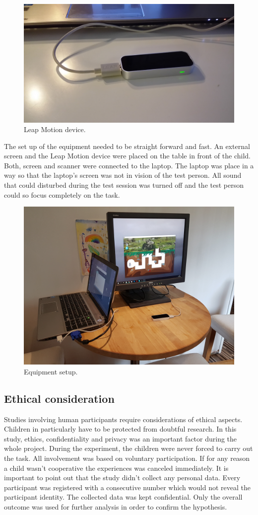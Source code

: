\begin{figure}[h]  %
  \centering
  \includegraphics[width=.5\textwidth]{figures/LMdevice.jpg}
  \caption[Leap Motion device.]{Leap Motion device.}
  \label{fig:setup}
\end{figure}

The set up of the equipment needed to be straight forward and fast. An external screen and the Leap Motion device were placed on the table in front of the child. Both, screen and scanner were connected to the laptop. The laptop was place in a way so that the laptop’s screen was not in vision of the test person. All sound that could disturbed during the test session was turned off and the test person could so focus completely on the task.

\begin{figure}[h]  %
  \centering
  \includegraphics[width=.5\textwidth]{figures/setup.jpg}
  \caption[Equipment setup.]{Equipment setup.}
  \label{fig:setup}
\end{figure}


\subsection{Ethical consideration}
\label{sec:ethical}

Studies involving human participants require considerations of ethical aspects. Children in particularly have to be protected from doubtful research. In this study, ethics, confidentiality and privacy was an important factor during the whole project.
During the experiment, the children were never forced to carry out the task. All involvement was based on voluntary participation. If for any reason a child wasn't cooperative the experiences was canceled immediately. 
It is important to point out that the study didn't collect any personal data. Every participant was registered with a consecutive number which would not reveal the participant identity. The collected data was kept confidential. Only the overall outcome was used for further analysis in order to confirm the hypothesis.  

